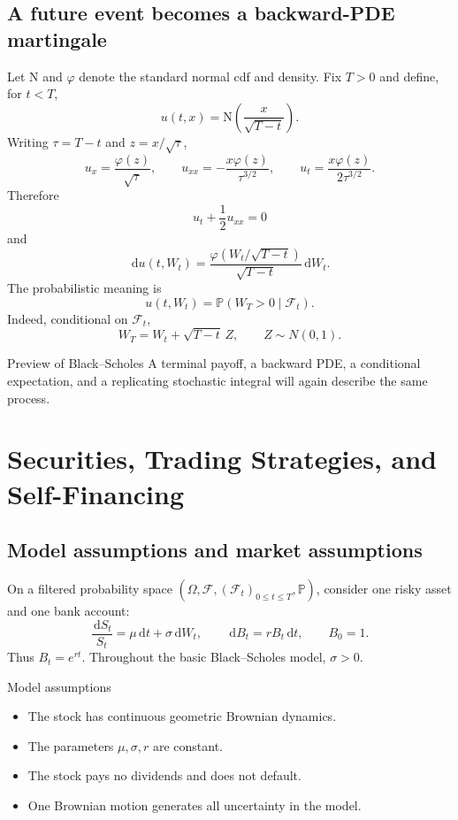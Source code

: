 \documentclass[10pt]{article}
\newcommand{\Pp}{\mathbb P}
\newcommand{\1}{\mathbf 1}
\newcommand{\cF}{\mathcal F}
\newcommand{\dd}{\,\mathrm d}
\newcommand{\Ncdf}{\mathrm N}
\newcommand{\phiN}{\varphi}
\theoremstyle{definition}
\begin{document}
\subsection{A future event becomes a backward-PDE martingale}

Let \(\Ncdf\) and \(\phiN\) denote the standard normal cdf and density. Fix
\(T>0\) and define, for \(t<T\),
\[
u(t,x)=\Ncdf\left(\frac{x}{\sqrt{T-t}}\right).
\]
Writing \(\tau=T-t\) and \(z=x/\sqrt{\tau}\),
\[
u_x=\frac{\phiN(z)}{\sqrt{\tau}},
\qquad
u_{xx}=-\frac{x\phiN(z)}{\tau^{3/2}},
\qquad
u_t=\frac{x\phiN(z)}{2\tau^{3/2}}.
\]
Therefore
\[
u_t+\frac12u_{xx}=0
\]
and
\[
\dd u(t,W_t)
=\frac{\phiN(W_t/\sqrt{T-t})}{\sqrt{T-t}}\dd W_t.
\]
The probabilistic meaning is
\[
\boxed{
u(t,W_t)=\Pp(W_T>0\mid\cF_t).}
\]
Indeed, conditional on \(\cF_t\),
\[
W_T=W_t+\sqrt{T-t}\,Z,\qquad Z\sim N(0,1).
\]

\begin{keyidea}{Preview of Black--Scholes}
A terminal payoff, a backward PDE, a conditional expectation, and a
replicating stochastic integral will again describe the same process.
\end{keyidea}

\section{Securities, Trading Strategies, and Self-Financing}

\subsection{Model assumptions and market assumptions}

On a filtered probability space
\((\Omega,\cF,(\cF_t)_{0\leq t\leq T},\Pp)\), consider one risky asset
and one bank account:
\[
\frac{\dd S_t}{S_t}=\mu\dd t+\sigma\dd W_t,
\qquad
\dd B_t=rB_t\dd t,\qquad B_0=1.
\]
Thus \(B_t=e^{rt}\). Throughout the basic Black--Scholes model,
\(\sigma>0\).

\begin{assumptionbox}{Model assumptions}
\begin{itemize}
  \item The stock has continuous geometric Brownian dynamics.
  \item The parameters \(\mu,\sigma,r\) are constant.
  \item The stock pays no dividends and does not default.
  \item One Brownian motion generates all uncertainty in the model.
\end{itemize}
\end{assumptionbox}
\end{document}
